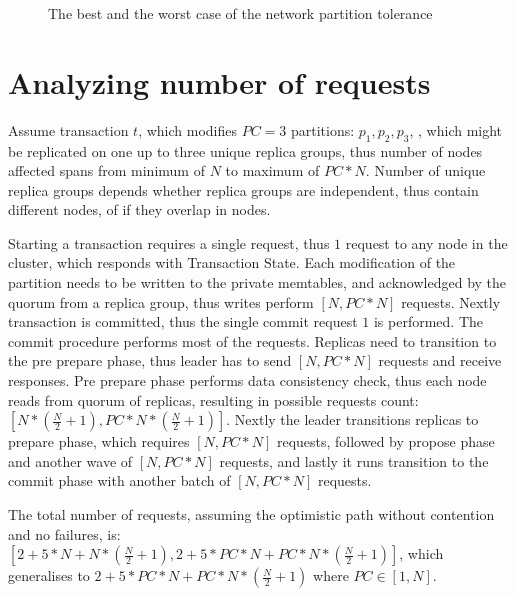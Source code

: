 \begin{figure}[hbt]
  \setlength{\unitlength}{1.3cm}  
  \caption{The best and the worst case of the network partition tolerance}
  \label{fig:tests:networkPartitionTolerance}
\end{figure}

\section{Analyzing number of requests}
Assume transaction $t$, which modifies $PC=3$ partitions: $p_{1}, p_{2}, p_{3}$,
, which might be replicated on one up to three unique replica groups, thus number of nodes affected spans from minimum of $N$ to maximum of $PC*N$. Number of unique replica groups depends whether replica groups are independent, thus contain different nodes, of if they overlap in nodes.

Starting a transaction requires a single request, thus $1$ request to any node in the cluster, which responds with Transaction State.
Each modification of the partition needs to be written to the private memtables, and acknowledged by the quorum from a replica group, thus writes perform $[N,PC*N]$ requests.
Nextly transaction is committed, thus the single commit request $1$ is performed.
The commit procedure performs most of the requests.
Replicas need to transition to the pre prepare phase, thus leader has to send $[N,PC*N]$ requests and receive responses.
Pre prepare phase performs data consistency check, thus each node reads from quorum of replicas, resulting in possible requests count: $[N * (\frac{N}{2} + 1),PC * N * (\frac{N}{2} + 1)]$.
Nextly the leader transitions replicas to prepare phase, which requires $[N,PC*N]$ requests, followed by propose phase and another wave of $[N,PC*N]$ requests, and lastly it runs transition to the commit phase with another batch of $[N,PC*N]$ requests.

The total number of requests, assuming the optimistic path without contention and no failures, 
is: $[2 + 5 * N + N * (\frac{N}{2} + 1), 2 + 5 * PC*N + PC * N * (\frac{N}{2} + 1)]$,
which generalises to $2 + 5 * PC*N + PC * N * (\frac{N}{2} + 1)$ where $PC \in [1, N]$.

